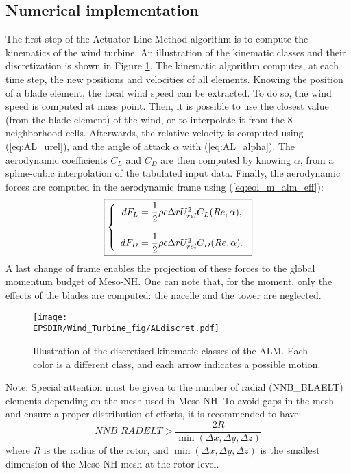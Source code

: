 \subsection{Numerical implementation}

The first step of the Actuator Line Method algorithm is to compute the kinematics of the wind turbine. An illustration of the kinematic classes and their discretization is shown in Figure \ref{fig:ALMdiscret}. The kinematic algorithm computes, at each time step, the new positions and velocities of all elements. 
Knowing the position of a blade element, the local wind speed can be extracted. To do so, the wind speed is computed at mass point. Then, it is possible to use the closest value (from the blade element) of the wind, or to interpolate it from the 8-neighborhood cells.
Afterwards, the relative velocity is computed using (\ref{eq:AL_urel}), and the angle of attack $\alpha$ with (\ref{eq:AL_alpha}). The aerodynamic coefficients $C_L$ and $C_D$ are then computed by knowing $\alpha$, from a spline-cubic interpolation of the tabulated input data. Finally, the aerodynamic forces are computed in the aerodynamic frame using (\ref{eq:eol_m_alm_eff}): 
\begin{equation}
\label{eq:eol_m_alm_eff_num}	
\fbox{$
\left\lbrace
\begin{array}{ccc}	
dF_{L} = \dfrac{1}{2} \rho c \Delta r U_{rel}^2 C_L(Re,\alpha),
\\   
\\
dF_{D} = \dfrac{1}{2} \rho c \Delta r U_{rel}^2 C_D(Re,\alpha).
\\
\end{array}\right.
$}
\end{equation}	
A last change of frame enables the projection of these forces to the global momentum budget of Meso-NH. One can note that, for the moment, only the effects of the blades are computed: the nacelle and the tower are neglected. 
\begin{figure}[h]
\centering
\texttt{[image: \\EPSDIR/Wind\_Turbine\_fig/ALdiscret.pdf]}
\caption{Illustration of the discretised kinematic classes of the ALM. Each color is a different class, and each arrow indicates a possible motion. \citet{joulin2019modelisation}}
\label{fig:ALMdiscret}  
\end{figure}

Note: Special attention must be given to the number of radial (NNB\_BLAELT) elements depending on the mesh used in Meso-NH. To avoid gaps in the mesh and ensure a proper distribution of efforts, it is recommended to have:
\begin{equation}
NNB\_RADELT > \dfrac{2R}{\min(\Delta x, \Delta y, \Delta z)}
\end{equation}
where $R$ is the radius of the rotor, and $\min(\Delta x, \Delta y, \Delta z)$ is the smallest dimension of the Meso-NH mesh at the rotor level.



